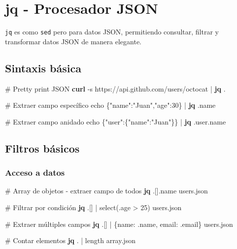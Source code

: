 \documentclass[
  11pt,
  letterpaper,
  oneside,
  openany]{scrbook}
\newenvironment{Shaded}{}{}
\newcommand{\AttributeTok}[1]{\textcolor[rgb]{0.84,0.23,0.29}{#1}}
\newcommand{\BuiltInTok}[1]{\textcolor[rgb]{0.84,0.23,0.29}{#1}}
\newcommand{\CommentTok}[1]{\textcolor[rgb]{0.42,0.45,0.49}{#1}}
\newcommand{\ExtensionTok}[1]{\textcolor[rgb]{0.84,0.23,0.29}{\textbf{#1}}}
\newcommand{\KeywordTok}[1]{\textcolor[rgb]{0.84,0.23,0.29}{#1}}
\newcommand{\NormalTok}[1]{\textcolor[rgb]{0.14,0.16,0.18}{#1}}
\newcommand{\StringTok}[1]{\textcolor[rgb]{0.01,0.18,0.38}{#1}}
\begin{document}
\section{jq - Procesador JSON}\label{sec-jq}

\texttt{jq} es como \texttt{sed} pero para datos JSON, permitiendo
consultar, filtrar y transformar datos JSON de manera elegante.

\subsection{Sintaxis básica}\label{sintaxis-buxe1sica-1}

\begin{Shaded}
\begin{Highlighting}[]
\CommentTok{\# Pretty print JSON}
\ExtensionTok{curl} \AttributeTok{{-}s}\NormalTok{ https://api.github.com/users/octocat }\KeywordTok{|} \ExtensionTok{jq}\NormalTok{ .}

\CommentTok{\# Extraer campo específico}
\BuiltInTok{echo} \StringTok{\textquotesingle{}\{"name":"Juan","age":30\}\textquotesingle{}} \KeywordTok{|} \ExtensionTok{jq}\NormalTok{ .name}

\CommentTok{\# Extraer campo anidado}
\BuiltInTok{echo} \StringTok{\textquotesingle{}\{"user":\{"name":"Juan"\}\}\textquotesingle{}} \KeywordTok{|} \ExtensionTok{jq}\NormalTok{ .user.name}
\end{Highlighting}
\end{Shaded}

\subsection{Filtros básicos}\label{filtros-buxe1sicos}

\subsubsection{Acceso a datos}\label{acceso-a-datos}

\begin{Shaded}
\begin{Highlighting}[]
\CommentTok{\# Array de objetos {-} extraer campo de todos}
\ExtensionTok{jq} \StringTok{\textquotesingle{}.[].name\textquotesingle{}}\NormalTok{ users.json}

\CommentTok{\# Filtrar por condición}
\ExtensionTok{jq} \StringTok{\textquotesingle{}.[] | select(.age \textgreater{} 25)\textquotesingle{}}\NormalTok{ users.json}

\CommentTok{\# Extraer múltiples campos}
\ExtensionTok{jq} \StringTok{\textquotesingle{}.[] | \{name: .name, email: .email\}\textquotesingle{}}\NormalTok{ users.json}

\CommentTok{\# Contar elementos}
\ExtensionTok{jq} \StringTok{\textquotesingle{}. | length\textquotesingle{}}\NormalTok{ array.json}
\end{Highlighting}
\end{Shaded}
\end{document}

